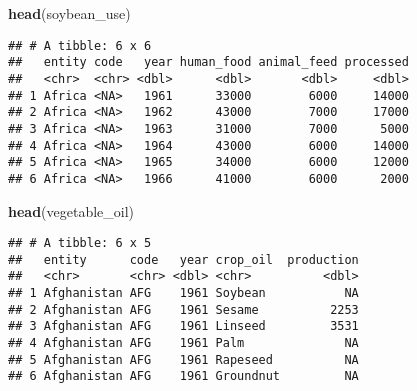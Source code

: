 \documentclass[
]{article}
\newenvironment{Shaded}{\begin{snugshade}}{\end{snugshade}}
\newcommand{\DataTypeTok}[1]{\textcolor[rgb]{0.13,0.29,0.53}{#1}}
\newcommand{\DecValTok}[1]{\textcolor[rgb]{0.00,0.00,0.81}{#1}}
\newcommand{\KeywordTok}[1]{\textcolor[rgb]{0.13,0.29,0.53}{\textbf{#1}}}
\newcommand{\NormalTok}[1]{#1}
\newcommand{\OperatorTok}[1]{\textcolor[rgb]{0.81,0.36,0.00}{\textbf{#1}}}
\newcommand{\StringTok}[1]{\textcolor[rgb]{0.31,0.60,0.02}{#1}}
\begin{document}
\begin{Shaded}
\begin{Highlighting}[]
\KeywordTok{head}\NormalTok{(soybean\_use)}
\end{Highlighting}
\end{Shaded}

\begin{verbatim}
## # A tibble: 6 x 6
##   entity code   year human_food animal_feed processed
##   <chr>  <chr> <dbl>      <dbl>       <dbl>     <dbl>
## 1 Africa <NA>   1961      33000        6000     14000
## 2 Africa <NA>   1962      43000        7000     17000
## 3 Africa <NA>   1963      31000        7000      5000
## 4 Africa <NA>   1964      43000        6000     14000
## 5 Africa <NA>   1965      34000        6000     12000
## 6 Africa <NA>   1966      41000        6000      2000
\end{verbatim}

\begin{Shaded}
\begin{Highlighting}[]
\KeywordTok{head}\NormalTok{(vegetable\_oil)}
\end{Highlighting}
\end{Shaded}

\begin{verbatim}
## # A tibble: 6 x 5
##   entity      code   year crop_oil  production
##   <chr>       <chr> <dbl> <chr>          <dbl>
## 1 Afghanistan AFG    1961 Soybean           NA
## 2 Afghanistan AFG    1961 Sesame          2253
## 3 Afghanistan AFG    1961 Linseed         3531
## 4 Afghanistan AFG    1961 Palm              NA
## 5 Afghanistan AFG    1961 Rapeseed          NA
## 6 Afghanistan AFG    1961 Groundnut         NA
\end{verbatim}

\begin{Shaded}
\end{Shaded}
\end{document}
